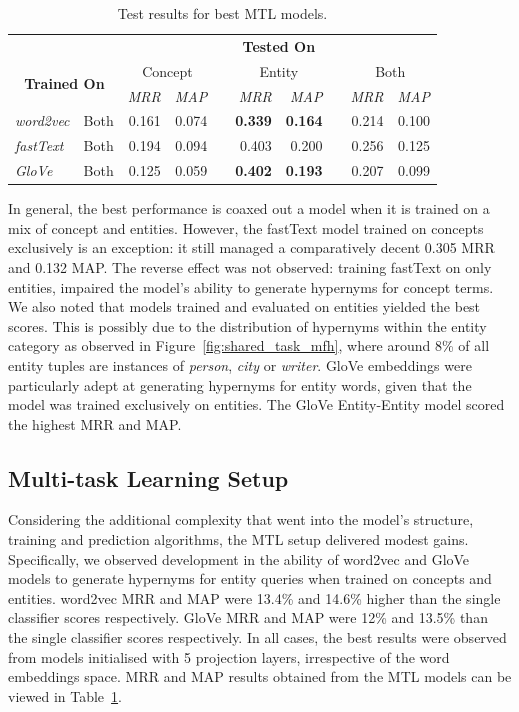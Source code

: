 \begin{table}\centering
\begin{tabular}{@{}llrrcrrcrr@{}}\toprule
& & \multicolumn{8}{c}{\textbf{Tested On}}\\ 
\cmidrule{3-10}
\multicolumn{2}{c}{\multirow[c]{2}{*}{\textbf{Trained On}}} & \multicolumn{2}{c}{Concept} & \phantom{a} & \multicolumn{2}{c}{Entity} & \phantom{a} & \multicolumn{2}{c}{Both}\\ 
\multicolumn{2}{c}{} & \textit{MRR} & \textit{MAP} && \textit{MRR} & \textit{MAP} && \textit{MRR} & \textit{MAP}\\
\cmidrule{3-4} \cmidrule{6-7} \cmidrule{9-10}  
\textit{word2vec} & Both & 0.161 & 0.074 && \textbf{0.339} & \textbf{0.164} && 0.214 & 0.100 \\ 
\textit{fastText} & Both & 0.194 & 0.094 && 0.403 & 0.200 && 0.256 & 0.125\\ 
\textit{GloVe} & Both & 0.125 & 0.059 && \textbf{0.402} & \textbf{0.193} && 0.207 & 0.099\\ 
\bottomrule
\end{tabular}
\caption{Test results for best \ac{MTL} models.}\label{tab:semeval_mtl}
\end{table}

In general, the best performance is coaxed out a model when it is trained on a mix of concept and entities.  However, the fastText model trained on concepts exclusively is an exception: it still managed a comparatively decent 0.305 \ac{MRR} and 0.132 \ac{MAP}.  The reverse effect was not observed: training fastText on only entities, impaired the model's ability to generate hypernyms for concept terms.  We also noted that models trained and evaluated on entities yielded the best scores.  This is possibly due to the distribution of hypernyms within the entity category as observed in Figure~\ref{fig:shared_task_mfh}, where around 8\% of all entity tuples are instances of \textit{person}, \textit{city} or \textit{writer}.  GloVe embeddings were particularly adept at generating hypernyms for entity words, given that the model was trained exclusively on entities.  The GloVe Entity-Entity model scored the highest \ac{MRR} and \ac{MAP}.

\subsection{Multi-task Learning Setup}
Considering the additional complexity that went into the model's structure, training and prediction algorithms, the \ac{MTL} setup delivered modest gains.  Specifically, we observed development in the ability of word2vec and GloVe models to generate hypernyms for entity queries when trained on concepts and entities.  word2vec \ac{MRR} and \ac{MAP} were 13.4\%  and 14.6\% higher than the single classifier scores respectively.  GloVe \ac{MRR} and \ac{MAP} were 12\% and 13.5\% than the single classifier scores respectively.  In all cases, the best results were observed from models initialised with 5 projection layers, irrespective of the word embeddings space.  \ac{MRR} and \ac{MAP} results obtained from the \ac{MTL} models can be viewed in Table~\ref{tab:semeval_mtl}.

